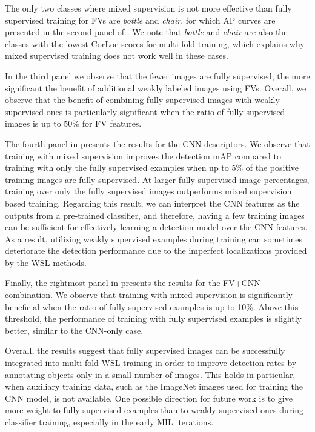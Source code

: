\documentclass[10pt,journal,cspaper,final,twocolumn,compsoc]{./IEEEtran}
\begin{document}
The only two classes where mixed supervision is not more
effective than fully supervised training for FVs are {\em bottle}
and {\em chair}, for which AP curves are presented in the
second panel of . We note that {\em bottle} and {\em chair}
are also the classes with the lowest CorLoc scores for
multi-fold training, which explains why mixed supervised
training does not work well in these cases.

In the third panel  we observe that the fewer images are
fully supervised, the more significant the benefit of
additional weakly labeled images using FVs. Overall,
we observe that the benefit of combining
fully supervised images with weakly supervised ones is particularly significant when
the ratio of fully supervised images is up to 50\%
for FV features.

The fourth panel in  presents the results for
the CNN descriptors. We observe that training with mixed
supervision improves the detection mAP compared to
training with only the fully supervised examples when up
to $5\%$ of the positive training images are
fully supervised. At larger fully supervised image
percentages, training over only the fully supervised
images outperforms mixed supervision based training.
Regarding this result, we can interpret the CNN features
as the outputs from a pre-trained classifier, and
therefore, having a few training images can be sufficient
for effectively learning a detection model over the CNN
features. As a result, utilizing weakly supervised
examples during training can sometimes deteriorate the
detection performance due to the imperfect localizations
provided by the WSL methods.

Finally, the rightmost panel in  presents the
results for the FV+CNN combination. We observe that training with
mixed supervision is significantly beneficial
when the ratio of fully supervised examples is up to  10\%.
Above this threshold, the performance of training with 
fully supervised examples is slightly better, similar to the
CNN-only case.

Overall, the results suggest that fully supervised images
can be successfully integrated into multi-fold WSL
training in order to improve detection rates by annotating
objects only in a small number of images. This holds in
particular, when auxiliary training data, such as the
ImageNet images used for training the CNN model, is not
available. One possible direction for future work is to
give more weight to fully supervised examples
than to weakly supervised ones during
classifier training, especially in the early 
MIL iterations.
\end{document}
